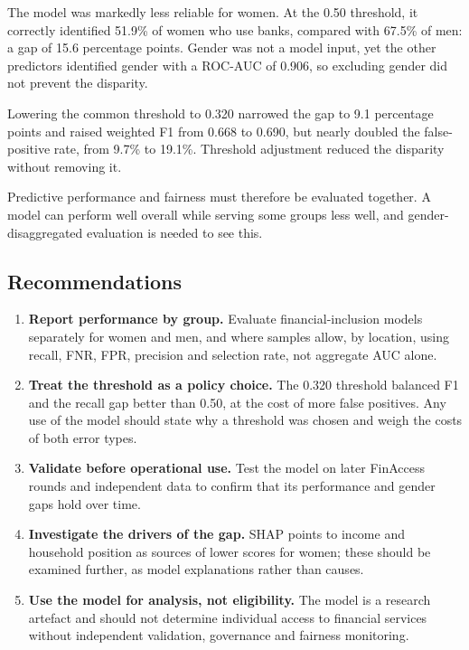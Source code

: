 \documentclass[11pt,a4paper]{article}
\begin{document}
The model was markedly less reliable for women. At the 0.50 threshold, it correctly identified 51.9\% of women who use banks, compared with 67.5\% of men: a gap of 15.6 percentage points. Gender was not a model input, yet the other predictors identified gender with a ROC-AUC of 0.906, so excluding gender did not prevent the disparity.

Lowering the common threshold to 0.320 narrowed the gap to 9.1 percentage points and raised weighted F1 from 0.668 to 0.690, but nearly doubled the false-positive rate, from 9.7\% to 19.1\%. Threshold adjustment reduced the disparity without removing it.

Predictive performance and fairness must therefore be evaluated together. A model can perform well overall while serving some groups less well, and gender-disaggregated evaluation is needed to see this.

\subsection{Recommendations}

\begin{enumerate}
  \item \textbf{Report performance by group.} Evaluate financial-inclusion models separately for women and men, and where samples allow, by location, using recall, FNR, FPR, precision and selection rate, not aggregate AUC alone.
  \item \textbf{Treat the threshold as a policy choice.} The 0.320 threshold balanced F1 and the recall gap better than 0.50, at the cost of more false positives. Any use of the model should state why a threshold was chosen and weigh the costs of both error types.
  \item \textbf{Validate before operational use.} Test the model on later FinAccess rounds and independent data to confirm that its performance and gender gaps hold over time.
  \item \textbf{Investigate the drivers of the gap.} SHAP points to income and household position as sources of lower scores for women; these should be examined further, as model explanations rather than causes.
  \item \textbf{Use the model for analysis, not eligibility.} The model is a research artefact and should not determine individual access to financial services without independent validation, governance and fairness monitoring.
\end{enumerate}
\end{document}
